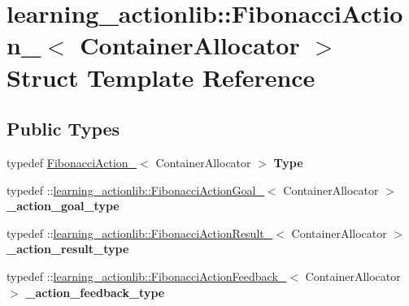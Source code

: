\hypertarget{structlearning__actionlib_1_1FibonacciAction__}{}\section{learning\+\_\+actionlib\+:\+:Fibonacci\+Action\+\_\+$<$ Container\+Allocator $>$ Struct Template Reference}
\label{structlearning__actionlib_1_1FibonacciAction__}
\subsection*{Public Types}
\begin{DoxyCompactItemize}
\item 
\mbox{\label{structlearning__actionlib_1_1FibonacciAction___afe7a9e7c6d7e1718d8d4c3e8244612fb}} 
typedef \hyperlink{structlearning__actionlib_1_1FibonacciAction__}{Fibonacci\+Action\+\_\+}$<$ Container\+Allocator $>$ {\bfseries Type}
\item 
\mbox{\label{structlearning__actionlib_1_1FibonacciAction___a88cea3787ae22032f963425fc285546e}} 
typedef \+::\hyperlink{structlearning__actionlib_1_1FibonacciActionGoal__}{learning\+\_\+actionlib\+::\+Fibonacci\+Action\+Goal\+\_\+}$<$ Container\+Allocator $>$ {\bfseries \+\_\+action\+\_\+goal\+\_\+type}
\item 
\mbox{\label{structlearning__actionlib_1_1FibonacciAction___acd9f18b86fbc153ba89ea3be6dec1053}} 
typedef \+::\hyperlink{structlearning__actionlib_1_1FibonacciActionResult__}{learning\+\_\+actionlib\+::\+Fibonacci\+Action\+Result\+\_\+}$<$ Container\+Allocator $>$ {\bfseries \+\_\+action\+\_\+result\+\_\+type}
\item 
\mbox{\label{structlearning__actionlib_1_1FibonacciAction___ab85b3132cba7dfb4e64396cb141721fc}} 
typedef \+::\hyperlink{structlearning__actionlib_1_1FibonacciActionFeedback__}{learning\+\_\+actionlib\+::\+Fibonacci\+Action\+Feedback\+\_\+}$<$ Container\+Allocator $>$ {\bfseries \+\_\+action\+\_\+feedback\+\_\+type}
\item 
\mbox{\label{structlearning__actionlib_1_1FibonacciAction___a010784b5d5b824966133dafa827aa176}} 

\end{DoxyCompactItemize}

